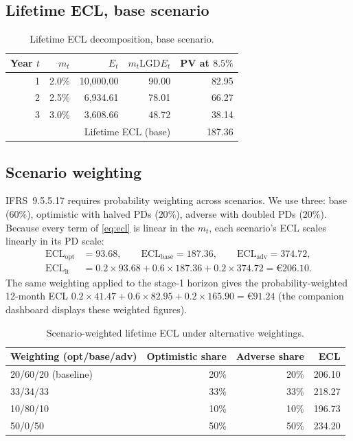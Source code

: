 \documentclass[11pt,a4paper]{report}
\renewcommand{\EUR}[1]{\euro#1}
\theoremstyle{definition}
\theoremstyle{plain}
\newcommand{\LGD}{\mathrm{LGD}}
\newcommand{\ECL}{\mathrm{ECL}}
\begin{document}
\subsection{Lifetime ECL, base scenario}

\begin{table}[htbp]
\centering
\caption{Lifetime ECL decomposition, base scenario.}
\label{tab:ltbase}
\begin{tabular}{rrrrr}
\toprule
Year $t$ & $m_t$ & $E_t$ & $m_t\LGD E_t$ & PV at $8.5\%$\\
\midrule
1 & 2.0\% & 10{,}000.00 & 90.00 & 82.95\\
2 & 2.5\% & 6{,}934.61 & 78.01 & 66.27\\
3 & 3.0\% & 3{,}608.66 & 48.72 & 38.14\\
\midrule
\multicolumn{4}{r}{Lifetime ECL (base)} & 187.36\\
\bottomrule
\end{tabular}
\end{table}

\subsection{Scenario weighting}

IFRS~9.5.5.17 requires probability weighting across scenarios. We use
three: base ($60\%$), optimistic with halved PDs ($20\%$), adverse with
doubled PDs ($20\%$). Because every term of \eqref{eq:ecl} is linear in
the $m_t$, each scenario's ECL scales linearly in its PD scale:
\begin{align}
  \ECL_{\text{opt}}&=93.68,\qquad \ECL_{\text{base}}=187.36,\qquad
  \ECL_{\text{adv}}=374.72,\\
  \ECL_{\text{lt}}
  &=0.2\times93.68+0.6\times187.36+0.2\times374.72
   =\EUR{206.10}.
\end{align}
The same weighting applied to the stage-1 horizon gives the
probability-weighted 12-month ECL
$0.2\times 41.47+0.6\times82.95+0.2\times165.90=\EUR{91.24}$
(the companion dashboard displays these weighted figures).

\begin{table}[htbp]
\centering
\caption{Scenario-weighted lifetime ECL under alternative weightings.}
\label{tab:weights}
\begin{tabular}{lrrr}
\toprule
Weighting (opt/base/adv) & Optimistic share & Adverse share & ECL\\
\midrule
20/60/20 (baseline) & 20\% & 20\% & 206.10\\
33/34/33 & 33\% & 33\% & 218.27\\
10/80/10 & 10\% & 10\% & 196.73\\
50/0/50 & 50\% & 50\% & 234.20\\
\bottomrule
\end{tabular}
\end{table}
\end{document}

